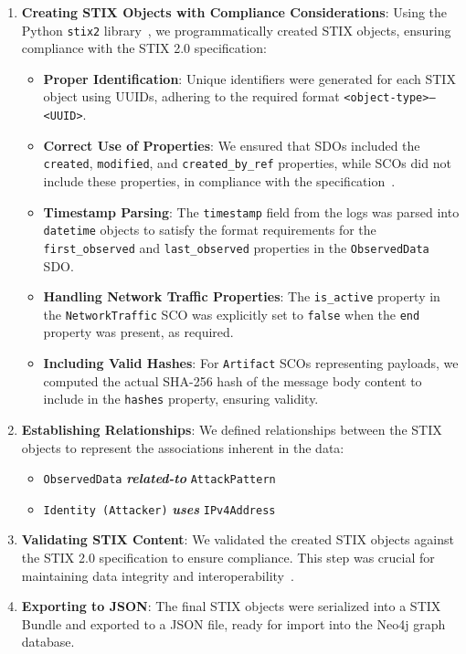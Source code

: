 \documentclass[conference]{IEEEtran}
\begin{document}
\begin{enumerate}
    \item \textbf{Creating STIX Objects with Compliance Considerations}: Using the Python \texttt{stix2} library~\cite{stix2python}, we programmatically created STIX objects, ensuring compliance with the STIX 2.0 specification:
    \begin{itemize}
        \item \textbf{Proper Identification}: Unique identifiers were generated for each STIX object using UUIDs, adhering to the required format \texttt{<object-type>--<UUID>}.
        \item \textbf{Correct Use of Properties}: We ensured that SDOs included the \texttt{created}, \texttt{modified}, and \texttt{created\_by\_ref} properties, while SCOs did not include these properties, in compliance with the specification~\cite{stix2017core}.
        \item \textbf{Timestamp Parsing}: The \texttt{timestamp} field from the logs was parsed into \texttt{datetime} objects to satisfy the format requirements for the \texttt{first\_observed} and \texttt{last\_observed} properties in the \texttt{ObservedData} SDO.
        \item \textbf{Handling Network Traffic Properties}: The \texttt{is\_active} property in the \texttt{NetworkTraffic} SCO was explicitly set to \texttt{false} when the \texttt{end} property was present, as required.
        \item \textbf{Including Valid Hashes}: For \texttt{Artifact} SCOs representing payloads, we computed the actual SHA-256 hash of the message body content to include in the \texttt{hashes} property, ensuring validity.
    \end{itemize}

    \item \textbf{Establishing Relationships}: We defined relationships between the STIX objects to represent the associations inherent in the data:
    \begin{itemize}
        \item \texttt{ObservedData} \textbf{\textit{related-to}} \texttt{AttackPattern}
        \item \texttt{Identity (Attacker)} \textbf{\textit{uses}} \texttt{IPv4Address}
    \end{itemize}

    \item \textbf{Validating STIX Content}: We validated the created STIX objects against the STIX 2.0 specification to ensure compliance. This step was crucial for maintaining data integrity and interoperability~\cite{stix2017core}.

    \item \textbf{Exporting to JSON}: The final STIX objects were serialized into a STIX Bundle and exported to a JSON file, ready for import into the Neo4j graph database.
\end{enumerate}
\end{document}
